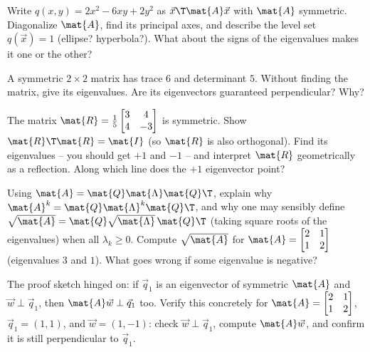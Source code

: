 \begin{exercise}
\label{ch26:ex-quadform}
Write $q(x,y)=2x^2 - 6xy + 2y^2$ as $\vec{x}\T\mat{A}\vec{x}$ with $\mat{A}$
symmetric. Diagonalize $\mat{A}$, find its principal axes, and describe the level
set $q(\vec{x})=1$ (ellipse? hyperbola?). What about the signs of the eigenvalues
makes it one or the other?
\end{exercise}

\begin{exercise}
\label{ch26:ex-trace}
A symmetric $2\times 2$ matrix has trace $6$ and determinant $5$. Without finding
the matrix, give its eigenvalues. Are its eigenvectors guaranteed perpendicular?
Why?
\end{exercise}

\begin{exercise}
\label{ch26:ex-reflection-ex}
The matrix $\mat{R}=\frac{1}{5}\begin{bmatrix}3&4\\4&-3\end{bmatrix}$ is symmetric.
Show $\mat{R}\T\mat{R}=\mat{I}$ (so $\mat{R}$ is also orthogonal). Find its
eigenvalues -- you should get $+1$ and $-1$ -- and interpret $\mat{R}$ geometrically
as a reflection. Along which line does the $+1$ eigenvector point?
\end{exercise}

\begin{exercise}
\label{ch26:ex-function}
Using $\mat{A}=\mat{Q}\mat{\Lambda}\mat{Q}\T$, explain why
$\mat{A}^k=\mat{Q}\mat{\Lambda}^k\mat{Q}\T$, and why one may sensibly define
$\sqrt{\mat{A}}=\mat{Q}\sqrt{\mat{\Lambda}}\,\mat{Q}\T$ (taking square roots of the
eigenvalues) when all $\lambda_k\ge 0$. Compute $\sqrt{\mat{A}}$ for
$\mat{A}=\begin{bmatrix}2&1\\1&2\end{bmatrix}$ (eigenvalues $3$ and $1$). What goes
wrong if some eigenvalue is negative?
\end{exercise}

\begin{exercise}
\label{ch26:ex-invariance}
The proof sketch hinged on: if $\vec{q}_1$ is an eigenvector of symmetric
$\mat{A}$ and $\vec{w}\perp\vec{q}_1$, then $\mat{A}\vec{w}\perp\vec{q}_1$ too.
Verify this concretely for $\mat{A}=\begin{bmatrix}2&1\\1&2\end{bmatrix}$,
$\vec{q}_1=(1,1)$, and $\vec{w}=(1,-1)$: check $\vec{w}\perp\vec{q}_1$, compute
$\mat{A}\vec{w}$, and confirm it is still perpendicular to $\vec{q}_1$.
\end{exercise}

